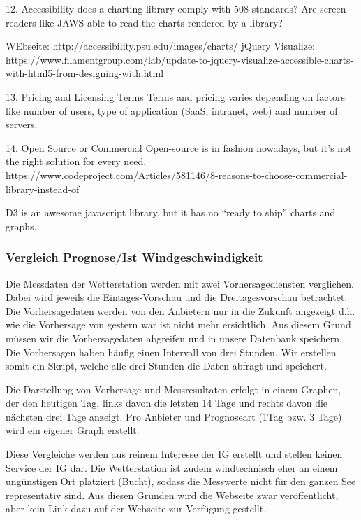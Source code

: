 12. Accessibility
 does a charting library comply with 508 standards? Are screen readers like JAWS able to read the charts rendered by a library?

 WEbseite: http://accessibility.psu.edu/images/charts/
 jQuery Visualize: https://www.filamentgroup.com/lab/update-to-jquery-visualize-accessible-charts-with-html5-from-designing-with.html

13. Pricing and Licensing Terms
 Terms and pricing varies depending on factors like number of users, type of application (SaaS, intranet, web) and number of servers.

14. Open Source or Commercial
 Open-source is in fashion nowadays, but it’s not the right solution for every need.
 https://www.codeproject.com/Articles/581146/8-reasons-to-choose-commercial-library-instead-of



 D3 is an awesome javascript library, but it has no “ready to ship” charts and graphs.


\subsubsection{Vergleich Prognose/Ist Windgeschwindigkeit}

Die Messdaten der Wetterstation werden mit zwei Vorhersagediensten verglichen. Dabei wird jeweils die Eintages-Vorschau und die Dreitagesvorschau betrachtet.
Die Vorhersagedaten werden von den Anbietern nur in die Zukunft angezeigt d.h. wie die Vorhersage von gestern war ist nicht mehr ersichtlich. Aus diesem Grund müssen wir die Vorhersagedaten abgreifen und in unsere Datenbank speichern. Die Vorhersagen haben häufig einen Intervall von drei Stunden. Wir erstellen somit ein Skript, welche alle drei Stunden die Daten abfragt und speichert.

Die Darstellung von Vorhersage und Messresultaten erfolgt in einem Graphen, der den heutigen Tag, links davon die letzten 14 Tage und rechts davon die nächsten drei Tage anzeigt. Pro Anbieter und Prognoseart (1Tag bzw. 3 Tage) wird ein eigener Graph erstellt.

Diese Vergleiche werden aus reinem Interesse der IG erstellt und stellen keinen Service der IG dar. Die Wetterstation ist zudem windtechnisch eher an einem ungünstigen Ort platziert (Bucht), sodass die Messwerte nicht für den ganzen See representativ sind.
Aus diesen Gründen wird die Webseite zwar veröffentlicht, aber kein Link dazu auf der Webseite zur Verfügung gestellt.

